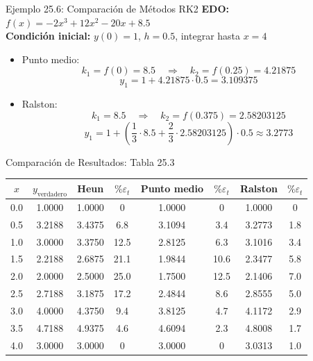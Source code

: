 \documentclass[main.tex]{subfiles}
\begin{document}
\begin{frame}{\small Ejemplo 25.6: Comparación de Métodos RK2}
\textbf{EDO:} \( f(x) = -2x^3 + 12x^2 - 20x + 8.5 \)
\\
\textbf{Condición inicial:} \( y(0) = 1 \), \( h = 0.5 \), integrar hasta \( x = 4 \)
\begin{itemize}
  \item Punto medio:
  \[ k_1 = f(0) = 8.5 \quad \Rightarrow \quad k_2 = f(0.25) = 4.21875 \]
  \[ y_1 = 1 + 4.21875 \cdot 0.5 = 3.109375 \]
  \item Ralston:
  \[ k_1 = 8.5 \quad \Rightarrow \quad k_2 = f(0.375) = 2.58203125 \]
  \[ y_1 = 1 + \left(\frac{1}{3}\cdot 8.5 + \frac{2}{3}\cdot 2.58203125\right) \cdot 0.5 \approx 3.2773 \]
\end{itemize}
\end{frame}

\begin{frame}{\small Comparación de Resultados: Tabla 25.3}
\scriptsize
\begin{tabular}{|c|c|c|c|c|c|c|c|}
\hline
$x$ & $y_{\text{verdadero}}$ & Heun & $\%\varepsilon_t$ & Punto medio & $\%\varepsilon_t$ & Ralston & $\%\varepsilon_t$ \\
\hline
0.0 & 1.0000 & 1.0000 & 0 & 1.0000 & 0 & 1.0000 & 0 \\
0.5 & 3.2188 & 3.4375 & 6.8 & 3.1094 & 3.4 & 3.2773 & 1.8 \\
1.0 & 3.0000 & 3.3750 & 12.5 & 2.8125 & 6.3 & 3.1016 & 3.4 \\
1.5 & 2.2188 & 2.6875 & 21.1 & 1.9844 & 10.6 & 2.3477 & 5.8 \\
2.0 & 2.0000 & 2.5000 & 25.0 & 1.7500 & 12.5 & 2.1406 & 7.0 \\
2.5 & 2.7188 & 3.1875 & 17.2 & 2.4844 & 8.6 & 2.8555 & 5.0 \\
3.0 & 4.0000 & 4.3750 & 9.4 & 3.8125 & 4.7 & 4.1172 & 2.9 \\
3.5 & 4.7188 & 4.9375 & 4.6 & 4.6094 & 2.3 & 4.8008 & 1.7 \\
4.0 & 3.0000 & 3.0000 & 0 & 3.0000 & 0 & 3.0313 & 1.0 \\
\hline
\end{tabular}
\end{frame}
\end{document}
